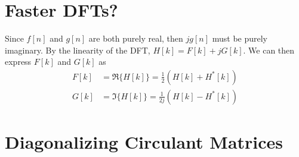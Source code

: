 \documentclass{article}
\begin{document}
\newpage
\section{Faster DFTs?}

Since \(f[n]\) and \(g[n]\) are both purely real, then \(j g[n]\) must be purely imaginary.
By the linearity of the DFT, \(H[k] = F[k] + j G[k]\).
We can then express \(F[k]\) and \(G[k]\) as
\begin{align}
    F[k] &= \Re\{H[k]\} = \frac{1}{2} (H[k] + H^\ast[k]) \\
    G[k] &= \Im\{H[k]\} = \frac{1}{2j} (H[k] - H^\ast[k])
\end{align}

\newpage
\section{Diagonalizing Circulant Matrices}
\end{document}
